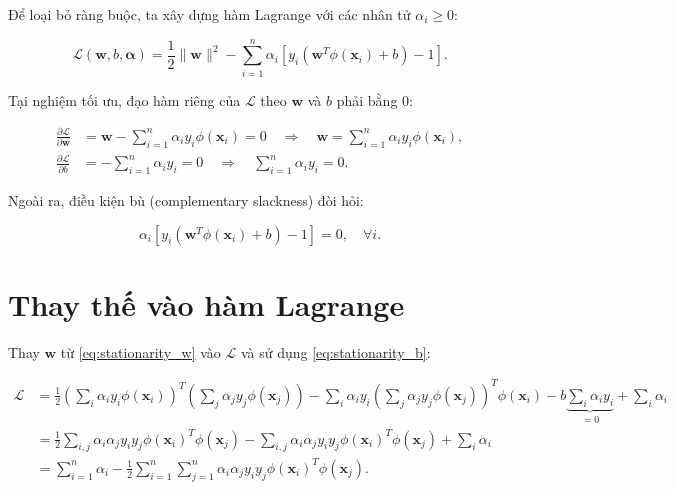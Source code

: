 \documentclass[12pt,a4paper]{article}
\theoremstyle{definition}
\theoremstyle{remark}
\begin{document}
Để loại bỏ ràng buộc, ta xây dựng hàm Lagrange với các nhân tử $\alpha_i \ge 0$:

\begin{equation}\label{eq:lagrangian}
\mathcal{L}(\mathbf{w}, b, \bm{\alpha}) = \frac{1}{2}\|\mathbf{w}\|^2 - \sum_{i=1}^n \alpha_i \left[ y_i(\mathbf{w}^T \phi(\mathbf{x}_i) + b) - 1 \right].
\end{equation}

Tại nghiệm tối ưu, đạo hàm riêng của $\mathcal{L}$ theo $\mathbf{w}$ và $b$ phải bằng $0$:

\begin{align}
\frac{\partial \mathcal{L}}{\partial \mathbf{w}} &= \mathbf{w} - \sum_{i=1}^n \alpha_i y_i \phi(\mathbf{x}_i) = 0 
\quad \Rightarrow \quad \mathbf{w} = \sum_{i=1}^n \alpha_i y_i \phi(\mathbf{x}_i), \label{eq:stationarity_w} \\
\frac{\partial \mathcal{L}}{\partial b} &= -\sum_{i=1}^n \alpha_i y_i = 0 
\quad \Rightarrow \quad \sum_{i=1}^n \alpha_i y_i = 0. \label{eq:stationarity_b}
\end{align}

Ngoài ra, điều kiện bù (complementary slackness) đòi hỏi:

\begin{equation}\label{eq:slackness}
\alpha_i \left[ y_i(\mathbf{w}^T \phi(\mathbf{x}_i) + b) - 1 \right] = 0, \quad \forall i.
\end{equation}

\section{Thay thế vào hàm Lagrange}

Thay $\mathbf{w}$ từ \eqref{eq:stationarity_w} vào $\mathcal{L}$ và sử dụng \eqref{eq:stationarity_b}:

\begin{align}
\mathcal{L} &= \frac{1}{2} \left( \sum_{i} \alpha_i y_i \phi(\mathbf{x}_i) \right)^T \left( \sum_{j} \alpha_j y_j \phi(\mathbf{x}_j) \right) 
- \sum_{i} \alpha_i y_i \left( \sum_{j} \alpha_j y_j \phi(\mathbf{x}_j) \right)^T \phi(\mathbf{x}_i) - b \underbrace{\sum_i \alpha_i y_i}_{=0} + \sum_i \alpha_i \nonumber \\
&= \frac{1}{2} \sum_{i,j} \alpha_i \alpha_j y_i y_j \phi(\mathbf{x}_i)^T \phi(\mathbf{x}_j) 
- \sum_{i,j} \alpha_i \alpha_j y_i y_j \phi(\mathbf{x}_i)^T \phi(\mathbf{x}_j) + \sum_i \alpha_i \nonumber \\
&= \sum_{i=1}^n \alpha_i - \frac{1}{2} \sum_{i=1}^n \sum_{j=1}^n \alpha_i \alpha_j y_i y_j \phi(\mathbf{x}_i)^T \phi(\mathbf{x}_j).
\end{align}
\end{document}
